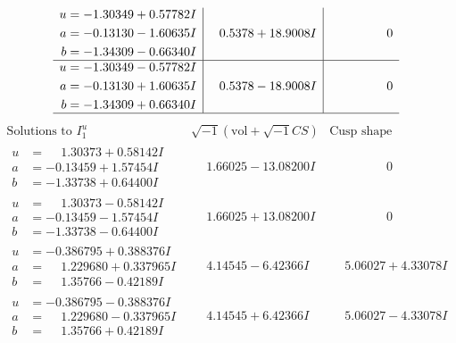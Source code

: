 \documentclass[1p]{elsarticle_modified}
\theoremstyle{definition}
\newcommand{\I}{\sqrt{-1}}
\begin{document}
$$\begin{array}{c|c|c}
\begin{aligned}
u &= -1.30349 + 0.57782 I \\
a &= -0.13130 - 1.60635 I \\
b &= -1.34309 - 0.66340 I\end{aligned}
 & \phantom{-}0.5378 + 18.9008 I & \phantom{-0.000000 } 0 \\ \hline\begin{aligned}
u &= -1.30349 - 0.57782 I \\
a &= -0.13130 + 1.60635 I \\
b &= -1.34309 + 0.66340 I\end{aligned}
 & \phantom{-}0.5378 - 18.9008 I & \phantom{-0.000000 } 0\\
 \hline 
 \end{array}$$\newpage$$\begin{array}{c|c|c}  
\text{Solutions to }I^u_{1}& \I (\text{vol} + \sqrt{-1}CS) & \text{Cusp shape}\\
 \hline 
\begin{aligned}
u &= \phantom{-}1.30373 + 0.58142 I \\
a &= -0.13459 + 1.57454 I \\
b &= -1.33738 + 0.64400 I\end{aligned}
 & \phantom{-}1.66025 - 13.08200 I & \phantom{-0.000000 } 0 \\ \hline\begin{aligned}
u &= \phantom{-}1.30373 - 0.58142 I \\
a &= -0.13459 - 1.57454 I \\
b &= -1.33738 - 0.64400 I\end{aligned}
 & \phantom{-}1.66025 + 13.08200 I & \phantom{-0.000000 } 0 \\ \hline\begin{aligned}
u &= -0.386795 + 0.388376 I \\
a &= \phantom{-}1.229680 + 0.337965 I \\
b &= \phantom{-}1.35766 - 0.42189 I\end{aligned}
 & \phantom{-}4.14545 - 6.42366 I & \phantom{-}5.06027 + 4.33078 I \\ \hline\begin{aligned}
u &= -0.386795 - 0.388376 I \\
a &= \phantom{-}1.229680 - 0.337965 I \\
b &= \phantom{-}1.35766 + 0.42189 I\end{aligned}
 & \phantom{-}4.14545 + 6.42366 I & \phantom{-}5.06027 - 4.33078 I \\ \hline\begin{aligned}

\end{aligned}
\end{array}$$
\end{document}
